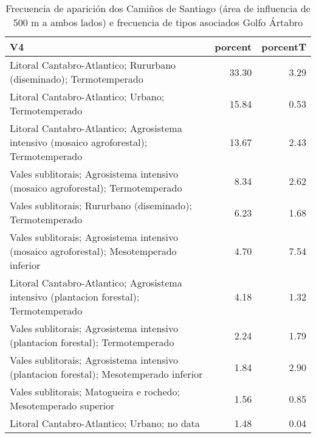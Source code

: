 \begin{table}[p]
\centering
\caption{Frecuencia de aparición dos Camiños de Santiago (área de influencia de 500 m a ambos lados) e frecuencia de tipos asociados Golfo Ártabro} 
\label{vcamino1}
\begin{tabular}{lrr}
  \hline
V4 & porcent & porcentT \\ 
  \hline
Litoral Cantabro-Atlantico; Rururbano (diseminado); Termotemperado & 33.30 & 3.29 \\ 
  Litoral Cantabro-Atlantico; Urbano; Termotemperado & 15.84 & 0.53 \\ 
  Litoral Cantabro-Atlantico; Agrosistema intensivo (mosaico agroforestal); Termotemperado & 13.67 & 2.43 \\ 
  Vales sublitorais; Agrosistema intensivo (mosaico agroforestal); Termotemperado & 8.34 & 2.62 \\ 
  Vales sublitorais; Rururbano (diseminado); Termotemperado & 6.23 & 1.68 \\ 
  Vales sublitorais; Agrosistema intensivo (mosaico agroforestal); Mesotemperado inferior & 4.70 & 7.54 \\ 
  Litoral Cantabro-Atlantico; Agrosistema intensivo (plantacion forestal); Termotemperado & 4.18 & 1.32 \\ 
  Vales sublitorais; Agrosistema intensivo (plantacion forestal); Termotemperado & 2.24 & 1.79 \\ 
  Vales sublitorais; Agrosistema intensivo (plantacion forestal); Mesotemperado inferior & 1.84 & 2.90 \\ 
  Vales sublitorais; Matogueira e rochedo; Mesotemperado superior & 1.56 & 0.85 \\ 
  Litoral Cantabro-Atlantico; Urbano; no data & 1.48 & 0.04 \\ 
   \hline
\end{tabular}
\end{table}
